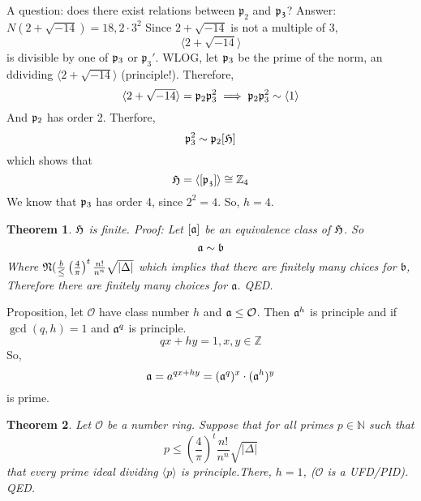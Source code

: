 \documentclass{article}
\theoremstyle{plain}
\newtheorem{thm}{Theorem}%
\theoremstyle{definition}
\begin{document}
A question: does there exist relations between $\mathfrak{p_2}$ and
$\frak{p_3}$? Answer: $N(2+\sqrt{-14}) = 18, 2\cdot 3^2$ Since $2+\sqrt{-14}$ is
not a multiple of 3, 
\[ \langle 2+\sqrt{-14} \rangle \]
is divisible by one of $\frak{p}_3$ or $\mathfrak{p}_3'$. WLOG, let $\frak{p}_3$
be the prime of the norm, an ddividing $\langle 2 + \sqrt{-14} \rangle$
(principle!). Therefore,
\[ \langle 2 + \sqrt{-14} \rangle = \frak{p}_2 \frak{p}_3^2 \implies \frak{p}_2
\frak{p}_3^2 \sim \langle 1 \rangle \]
And $\frak{p}_2$ has order 2. Therfore, 
\[ \frak{p}_3^2 \sim \frak{p}_2[\frak{H}] \]
which shows that
\[ \frak{H} = \langle [ \frak{p_3}] \rangle\cong \mathbb{Z}_4 \]
We know that $\frak{p}_3$ has order 4, since $2^2 = 4$. So, $h = 4$.

\begin{thm}
$\frak{H}$ is finite.
Proof: Let $[\frak{a}]$ be an equivalence class of $\frak{H}$. So
\[ \frak{a} \sim \frak{b} \]
Where $\frak{N}(\frac{b} \leq \left( \frac{4}{\pi}\right)^t \frac{n!}{n^n}
\sqrt{|\Delta|}$
which implies that there are finitely many chices for $\mathfrak{b}$,
Therefore there are finitely many choices for $\mathfrak{a}$. QED.
\end{thm}
Proposition, let $\mathcal{O}$ have class number $h$ and $\frak{a} \leq
\mathcal{O}$. Then $\frak{a}^h$ is principle and if $\gcd(q,h) = 1$ and
$\frak{a}^q$ is principle. 
\[ qx + hy = 1, x,y \in \mathbb{Z} \]
So, 
\[ \frak{a} = a^{qx + hy} = (\frak{a}^q)^x\cdot(\frak{a}^h)^y \]
is prime. 

\begin{thm}
Let $\mathcal{O}$ be a number ring. Suppose that for all primes $p \in
\mathbb{N}$ such that 
\[ p \leq \left( \frac{4}{\pi}\right)^t \frac{n!}{n^n}
\sqrt{|\Delta|} \]
that every prime ideal dividing $\langle p \rangle$ is principle.There, $h = 1$,
($\mathcal{O}$ is a UFD/PID). QED.

\end{thm}
\end{document}

